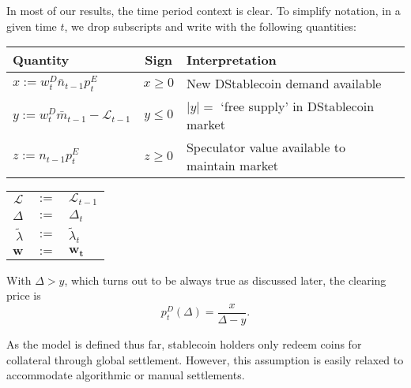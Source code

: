 In most of our results, the time period context is clear. To simplify notation, in a given time $t$, we drop subscripts and write with the following quantities:

\begin{center}
	\begin{tabular}{l c l}
		\textbf{Quantity}					&\textbf{Sign}&\textbf{Interpretation} \\
		\hline
		$x:=w^D_t \bar n_{t-1} p^E_t$ 		&$x\geq 0$	& New DStablecoin demand available	\\
		$y:=w^D_t \bar m_{t-1} - \mathcal{L}_{t-1}$	&	$y\leq 0$	& $|y| = $ `free supply' in DStablecoin market \\
		$z:=n_{t-1} p^E_t$ 			&	$z\geq 0$	& Speculator value available to maintain market \\
		\hline
	\end{tabular}
\end{center}
\begin{center}
	\begin{tabular}{r c l}
		\hline
		$\mathcal{L}$	&$:=$&	$\mathcal{L}_{t-1}$ \\
		$\Delta$		&$:=$&	$\Delta_t$ \\
		$\tilde \lambda$&$:=$&	$\tilde \lambda_t$ \\
		$\mathbf{w}$	&$:=$&	$\mathbf{w_t}$ \\
		\hline
	\end{tabular}
\end{center}

With $\Delta > y$, which turns out to be always true as discussed later, the clearing price is
$$p_t^D(\Delta) = \frac{x}{\Delta-y}.$$

As the model is defined thus far, stablecoin holders only redeem coins for collateral through global settlement. However, this assumption is easily relaxed to accommodate algorithmic or manual settlements.